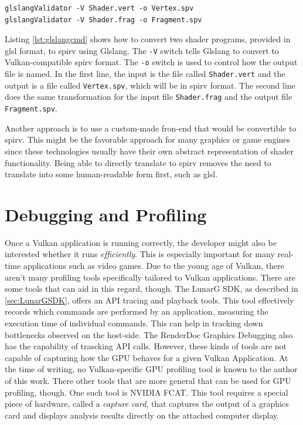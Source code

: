     \begin{lstlisting}[label=lst:glslangcmd]
glslangValidator -V Shader.vert -o Vertex.spv
glslangValidator -V Shader.frag -o Fragment.spv\end{lstlisting}

    Listing \ref{lst:glslangcmd} shows how to convert two shader programs, provided in \gls{glsl} format, to \gls{spirv} using Glslang. The \lstinline{-V} switch tells Glslang to convert to Vulkan-compatible \gls{spirv} format. The \lstinline{-o} switch is used to control how the output file is named. In the first line, the input is the file called \lstinline{Shader.vert} and the output is a file called \lstinline{Vertex.spv}, which will be in \gls{spirv} format. The second line does the same transformation for the input file \lstinline{Shader.frag} and the output file \lstinline{Fragment.spv}.

    Another approach is to use a custom-made fron-end that would be convertible to \gls{spirv}. This might be the favorable approach for many graphics or game engines since these technologies usually have their own abstract representation of shader functionality. Being able to directly translate to \gls{spirv} removes the need to translate into some human-readable form first, such as \gls{glsl}.


  \section{Debugging and Profiling}
  \label{sec:DebuggingAndProfiling}

    Once a Vulkan application is running correctly, the developer might also be interested whether it runs \textit{efficiently}. This is especially important for many real-time applications such as video games. Due to the young age of Vulkan, there aren't many profiling tools specifically tailored to Vulkan applications. There are some tools that can aid in this regard, though. The LunarG SDK, as described in \ref{sec:LunarGSDK}, offers an API tracing and playback tools. This tool effectively records which commands are performed by an application, measuring the execution time of individual commands. This can help in tracking down bottlenecks observed on the host-side. The RenderDoc Graphics Debugging\cite{renderdoc} also has the capability of trascking API calls. However, these kinds of tools are not capable of capturing how the GPU behaves for a given Vulkan Application. At the time of writing, no Vulkan-specific GPU profiling tool is known to the author of this work. There other tools that are more general that can be used for GPU profiling, though. One such tool is NVIDIA FCAT\cite{nvidiafcat}. This tool requires a special piece of hardware, called a \textit{capture card}, that captures the output of a graphics card and displays analysis results directly on the attached computer display.

